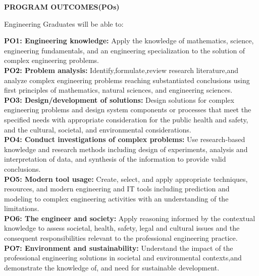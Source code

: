\providecommand{\normal}{\fontsize{12pt}{16pt}\selectfont}
\providecommand{\size}{\fontsize{14pt}{18pt}\selectfont}
\providecommand{\bigsize}{\fontsize{16pt}{20pt}\selectfont}
\providecommand{\bigbigsize}{\fontsize{20pt}{24pt}\selectfont}
\begin{flushleft}
\size\textbf{PROGRAM OUTCOMES(POs)}
\end{flushleft}

\noindent Engineering Graduates will be able to:

\vspace{3mm}
\noindent\textbf{PO1: Engineering knowledge:} Apply the knowledge of mathematics, science, engineering fundamentals, and an engineering specialization to the solution of complex engineering problems.\\[2mm]
\textbf{PO2: Problem analysis:} Identify,formulate,review research literature,and analyze complex engineering problems reaching substantiated conclusions using first principles of mathematics, natural sciences, and engineering sciences.\\[2mm]
\textbf{PO3: Design/development of solutions:} Design solutions for complex engineering problems and design system components or processes that meet the specified needs with appropriate consideration for the public health and safety, and the cultural, societal, and environmental considerations.\\[2mm]
\textbf{PO4: Conduct investigations of complex problems:} Use research-based knowledge and research methods including design of experiments, analysis and interpretation of data, and synthesis of the information to provide valid conclusions.\\[2mm]
\textbf{PO5: Modern tool usage:} Create, select, and apply appropriate techniques, resources, and modern engineering and IT tools including prediction and modeling to complex engineering activities with an understanding of the limitations.\\[2mm]
\textbf{PO6: The engineer and society:} Apply reasoning informed by the contextual knowledge to assess societal, health, safety, legal and cultural issues and the consequent responsibilities relevant to the professional engineering practice.\\[2mm]
\textbf{PO7: Environment and sustainability:} Understand the impact of the professional engineering solutions in societal and environmental contexts,and demonstrate the knowledge of, and need for sustainable development.\\[2mm]
